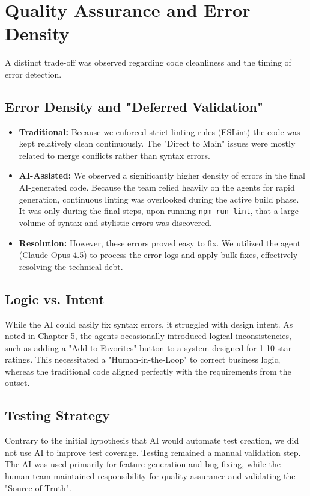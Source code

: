 \documentclass[a4paper,12pt]{report}
\begin{document}
\section{Quality Assurance and Error Density}
A distinct trade-off was observed regarding code cleanliness and the timing of error detection.

\subsection{Error Density and "Deferred Validation"}
\begin{itemize}
    \item \textbf{Traditional:} Because we enforced strict linting rules (ESLint) the code was kept relatively clean continuously. The "Direct to Main" issues were mostly related to merge conflicts rather than syntax errors.
    \item \textbf{AI-Assisted:} We observed a significantly higher density of errors in the final AI-generated code. Because the team relied heavily on the agents for rapid generation, continuous linting was overlooked during the active build phase. It was only during the final steps, upon running \texttt{npm run lint}, that a large volume of syntax and stylistic errors was discovered.
    \item \textbf{Resolution:} However, these errors proved easy to fix. We utilized the agent (Claude Opus 4.5) to process the error logs and apply bulk fixes, effectively resolving the technical debt.
\end{itemize}

\subsection{Logic vs. Intent}
While the AI could easily fix syntax errors, it struggled with design intent. As noted in Chapter 5, the agents occasionally introduced logical inconsistencies, such as adding a "Add to Favorites" button to a system designed for 1-10 star ratings. This necessitated a "Human-in-the-Loop" to correct business logic, whereas the traditional code aligned perfectly with the requirements from the outset.

\subsection{Testing Strategy}
Contrary to the initial hypothesis that AI would automate test creation, we did not use AI to improve test coverage. Testing remained a manual validation step. The AI was used primarily for feature generation and bug fixing, while the human team maintained responsibility for quality assurance and validating the "Source of Truth".
\end{document}
